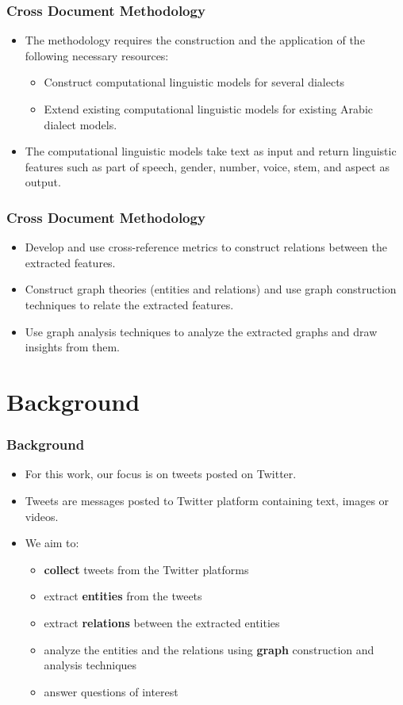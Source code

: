 \documentclass[xcolor=table]{beamer}
\begin{document}
\begin{frame}
\frametitle{Cross Document Methodology}
\begin{itemize}
\item The methodology requires the construction and the application of the following necessary resources:
\begin{itemize}
    \item Construct computational linguistic models for several dialects 
    \item Extend existing computational linguistic models for existing Arabic dialect models.
\end{itemize}

    \item The computational linguistic models take text as input and return linguistic features such as part of speech, gender, number, voice, stem, and aspect as output.
\end{itemize}
\end{frame}
\begin{frame}
\frametitle{Cross Document Methodology}
\begin{itemize}
     \item Develop and use cross-reference metrics to construct relations between the extracted features.
     \item Construct graph theories (entities and relations) and use graph construction techniques to relate the extracted features.
    \item Use graph analysis techniques to analyze the extracted graphs and draw insights from them.
\end{itemize}


\end{frame}

\section{Background}
\begin{frame}
\frametitle{Background}
\begin{itemize}
\item For this work, our focus is on tweets posted on Twitter.
\item Tweets are messages posted to Twitter platform containing text, images or videos.
\item We aim to:
\begin{itemize}
\item \textbf{collect} tweets from the Twitter platforms
\item extract \textbf{entities} from the tweets
\item extract \textbf{relations} between the extracted entities
\item analyze the entities and the relations using \textbf{graph} construction and analysis techniques 
\item answer questions of interest
\end{itemize}
\end{itemize}

\end{frame}
\end{document}
